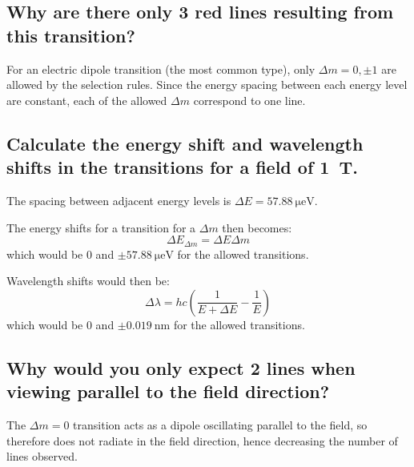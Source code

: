 \documentclass[a4paper]{scrartcl}
\begin{document}
\subsection{Why are there only 3 red lines resulting from this transition?}
For an electric dipole transition (the most common type), only \(\Delta m = 0, \pm 1\) are allowed by the selection rules. Since the energy spacing between each energy level are constant, each of the allowed \(\Delta m\) correspond to one line.

\subsection{Calculate the energy shift and wavelength shifts in the transitions for a field of \SI{1}{\tesla}.}
The spacing between adjacent energy levels is \(\Delta E = \SI{57.88}{\micro\electronvolt}\).

The energy shifts for a transition for a \(\Delta m\) then becomes:
\[\Delta E_{\Delta m} = \Delta E \Delta m\]
which would be 0 and \(\pm\SI{57.88}{\micro\electronvolt}\) for the allowed transitions.

Wavelength shifts would then be:
\[\Delta \lambda = h c \left(\frac{1}{E + \Delta E} - \frac{1}{E}\right)\]
which would be 0 and \(\pm\SI{0.019}{\nano\metre}\) for the allowed transitions.

\subsection{Why would you only expect 2 lines when viewing parallel to the field direction?}
The \(\Delta m = 0\) transition acts as a dipole oscillating parallel to the field, so therefore does not radiate in the field direction, hence decreasing the number of lines observed.
\end{document}
